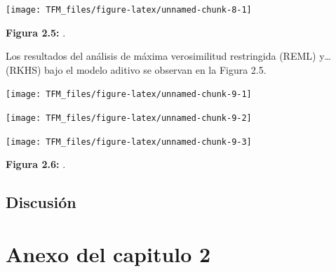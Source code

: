 \documentclass[11pt,spanish,a4paper,oneside,]{book} %
\begin{document}
\begin{center}\texttt{[image: TFM\_files/figure-latex/unnamed-chunk-8-1]} \end{center}

\begin{center}
\textbf{Figura 2.5:} .

\end{center}

Los resultados del análisis de máxima verosimilitud restringida (REML) y\ldots{} (RKHS) bajo el modelo aditivo se observan en la Figura 2.5.

\begin{center}\texttt{[image: TFM\_files/figure-latex/unnamed-chunk-9-1]} \end{center}

\begin{center}\texttt{[image: TFM\_files/figure-latex/unnamed-chunk-9-2]} \end{center}

\begin{center}\texttt{[image: TFM\_files/figure-latex/unnamed-chunk-9-3]} \end{center}

\begin{center}
\textbf{Figura 2.6:} .

\end{center}

\hypertarget{discussion2}{%
\section{Discusión}\label{discussion2}}

\hypertarget{appendix-appendix}{%
\appendix}


\hypertarget{anexo-del-capitulo-2}{%
\chapter{Anexo del capitulo 2}\label{anexo-del-capitulo-2}}
\end{document}
